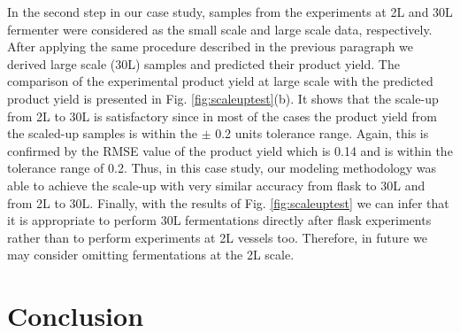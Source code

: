 \documentclass{article}
\begin{document}
In the second step in our case study, %
samples from the experiments at 2L and 30L fermenter were considered as the small scale and large scale data, respectively. After applying the same procedure described in the previous paragraph we derived large scale (30L) samples and predicted their product yield. The comparison of the experimental product yield at large scale with the predicted product yield is presented in Fig. \ref{fig:scaleuptest}(b). It shows that the scale-up from 2L to 30L is satisfactory since in most of the cases the product yield from the scaled-up samples is within the $\pm$ 0.2 units tolerance range. Again, this is confirmed by the RMSE value of the product yield which is 0.14 and is within the tolerance range of 0.2. Thus, in this case study, our modeling methodology was able to achieve the scale-up with very similar accuracy from flask to 30L and from 2L to 30L. Finally, with the results of Fig. \ref{fig:scaleuptest} we can infer that it is appropriate to perform 30L fermentations directly after flask experiments rather than to perform experiments at 2L vessels too. Therefore, in future we may consider omitting fermentations at the 2L scale.

%

\vspace{-1mm}
\section{Conclusion}
\label{sec:conclusion}
\vspace{-1mm}
\end{document}
